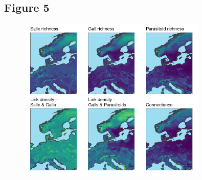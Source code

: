 \documentclass[12pt]{article}
\begin{document}
\newpage




\subsection*{Figure 5}

\begin{figure}[ht!]
\centering\includegraphics[width=0.8\textwidth]{figures/map_connectance.png}
\end{figure}

\newpage


\end{document}
